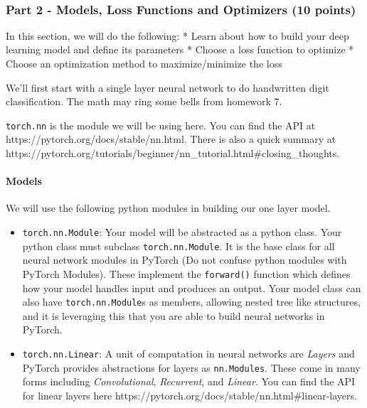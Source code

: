 \documentclass[11pt]{article}
\begin{document}
    \begin{center}
    \end{center}
    { \hspace*{\fill} \\}
    
    \hypertarget{part-2---models-loss-functions-and-optimizers-10-points}{%
\subsubsection{Part 2 - Models, Loss Functions and Optimizers (10
points)}\label{part-2---models-loss-functions-and-optimizers-10-points}}

In this section, we will do the following: * Learn about how to build
your deep learning model and define its parameters * Choose a loss
function to optimize * Choose an optimization method to
maximize/minimize the loss

We'll first start with a single layer neural network to do handwritten
digit classification. The math may ring some bells from homework 7.

\texttt{torch.nn} is the module we will be using here. You can find the
API at https://pytorch.org/docs/stable/nn.html. There is also a quick
summary at
https://pytorch.org/tutorials/beginner/nn\_tutorial.html\#closing\_thoughts.

\hypertarget{models}{%
\paragraph{Models}\label{models}}

We will use the following python modules in building our one layer
model.

\begin{itemize}
\item
  \texttt{torch.nn.Module}: Your model will be abstracted as a python
  class. Your python class must subclass \texttt{torch.nn.Module}. It is
  the base class for all neural network modules in PyTorch (Do not
  confuse python modules with PyTorch Modules). These implement the
  \texttt{forward()} function which defines how your model handles input
  and produces an output. Your model class can also have
  \texttt{torch.nn.Module}s as members, allowing nested tree like
  structures, and it is leveraging this that you are able to build
  neural networks in PyTorch.
\item
  \texttt{torch.nn.Linear}: A unit of computation in neural networks are
  \emph{Layers} and PyTorch provides abstractions for layers as
  \texttt{nn.Modules}. These come in many forms including
  \emph{Convolutional}, \emph{Recurrent}, and \emph{Linear}. You can
  find the API for linear layers here
  https://pytorch.org/docs/stable/nn.html\#linear-layers.
\end{itemize}
\end{document}
